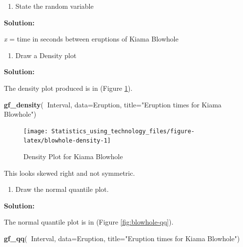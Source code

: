 \documentclass[
]{book}
\newenvironment{Shaded}{\begin{snugshade}}{\end{snugshade}}
\newcommand{\DataTypeTok}[1]{\textcolor[rgb]{0.13,0.29,0.53}{#1}}
\newcommand{\KeywordTok}[1]{\textcolor[rgb]{0.13,0.29,0.53}{\textbf{#1}}}
\newcommand{\NormalTok}[1]{#1}
\newcommand{\OperatorTok}[1]{\textcolor[rgb]{0.81,0.36,0.00}{\textbf{#1}}}
\newcommand{\StringTok}[1]{\textcolor[rgb]{0.31,0.60,0.02}{#1}}
\providecommand{\tightlist}{%
  \setlength{\itemsep}{0pt}\setlength{\parskip}{0pt}}
\begin{document}
\begin{enumerate}
\def\labelenumi{\alph{enumi}.}
\tightlist
\item
  State the random variable
\end{enumerate}

\textbf{Solution:}

\emph{x} = time in seconds between eruptions of Kiama Blowhole

\begin{enumerate}
\def\labelenumi{\alph{enumi}.}
\setcounter{enumi}{1}
\tightlist
\item
  Draw a Density plot
\end{enumerate}

\textbf{Solution:}

The density plot produced is in (Figure \ref{fig:blowhole-density}).



\begin{Shaded}
\begin{Highlighting}[]
\KeywordTok{gf_density}\NormalTok{(}\OperatorTok{~}\NormalTok{Interval, }\DataTypeTok{data=}\NormalTok{Eruption, }\DataTypeTok{title=}\StringTok{"Eruption times for Kiama Blowhole"}\NormalTok{)}
\end{Highlighting}
\end{Shaded}

\begin{figure}
\texttt{[image: Statistics\_using\_technology\_files/figure-latex/blowhole-density-1]} \caption{Density Plot for Kiama Blowhole}\label{fig:blowhole-density}
\end{figure}

This looks skewed right and not symmetric.

\begin{enumerate}
\def\labelenumi{\alph{enumi}.}
\setcounter{enumi}{2}
\tightlist
\item
  Draw the normal quantile plot.
\end{enumerate}

\textbf{Solution:}

The normal quantile plot is in (Figure \ref{fig:blowhole-qq}).



\begin{Shaded}
\begin{Highlighting}[]
\KeywordTok{gf_qq}\NormalTok{(}\OperatorTok{~}\NormalTok{Interval, }\DataTypeTok{data=}\NormalTok{Eruption, }\DataTypeTok{title=}\StringTok{"Eruption times for Kiama Blowhole"}\NormalTok{)}
\end{Highlighting}
\end{Shaded}
\end{document}
